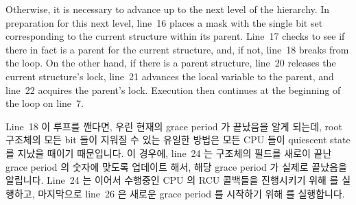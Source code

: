 Otherwise, it is necessary to advance up to the next level of the
 hierarchy.
In preparation for this next level, line~16 places a mask with the
single bit set corresponding to the current  structure within
its parent.
Line~17 checks to see if there in fact is a parent for the current
 structure, and, if not, line~18 breaks from the
loop.
On the other hand, if there is a parent  structure,
line~20 releases the current  structure's lock,
line~21 advances the  local variable to the parent,
and line~22 acquires the parent's lock.
Execution then continues at the beginning of the loop on line~7.
\fi

Line~18 이 루프를 깬다면, 우린 현재의 grace period 가 끝났음을 알게 되는데,
root  구조체의 모든 bit 들이 지워질 수 있는 유일한 방법은 모든 CPU
들이 quiescent state 를 지났을 때이기 때문입니다.
이 경우에, line~24 는  구조체의  필드를 새로이
끝난 grace period 의 숫자에 맞도록 업데이트 해서, 해당 grace period 가 실제로
끝났음을 알립니다.
Line~24 는 이어서 수행중인 CPU 의 RCU 콜백들을 진행시키기 위해
 를 실행하고, 마지막으로 line~26 은 새로운 grace
period 를 시작하기 위해  를 실행합니다.
\iffalse

If line~18 breaks from the loop, we know that the current grace period
has ended, as the only way that all bits can be cleared in the
root \co{rcu_node} structure is if all CPUs have passed through
quiescent states.
In this case, line~24 updates the \co{rcu_state} structure's
\co{->completed} field to match the number of the newly ended grace
period, indicating that the grace period has in fact ended.
Line~24 then invokes \co{rcu_process_gp_end()} to advance the
running CPU's RCU callbacks,
and, finally, line~26 invokes \co{rcu_start_gp()} in order to
start a new grace period should any remaining callbacks on the currently
running CPU require one.
\fi

